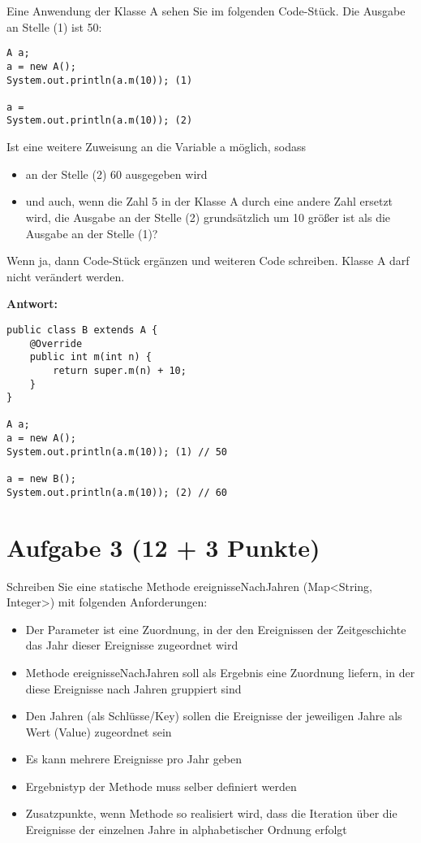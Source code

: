 Eine Anwendung der Klasse A sehen Sie im folgenden Code-Stück. Die Ausgabe an
Stelle (1) ist 50:

\begin{lstlisting}
A a;
a = new A();
System.out.println(a.m(10)); (1)

a =
System.out.println(a.m(10)); (2)
\end{lstlisting}

Ist eine weitere Zuweisung an die Variable a möglich, sodass
\begin{itemize}
    \item an der Stelle (2) 60 ausgegeben wird
    \item und auch, wenn die Zahl 5 in der Klasse A durch eine andere Zahl ersetzt wird,
          die Ausgabe an der Stelle (2) grundsätzlich um 10 größer ist als die Ausgabe an
          der Stelle (1)?
\end{itemize}

Wenn ja, dann Code-Stück ergänzen und weiteren Code schreiben. Klasse A darf
nicht verändert werden.

\textbf{Antwort:}

\begin{lstlisting}
public class B extends A {
    @Override
    public int m(int n) {
        return super.m(n) + 10;
    }
}

A a;
a = new A();
System.out.println(a.m(10)); (1) // 50

a = new B();
System.out.println(a.m(10)); (2) // 60
\end{lstlisting}

\section{Aufgabe 3 (12 + 3 Punkte)}

Schreiben Sie eine statische Methode ereignisseNachJahren (Map<String,
Integer>) mit folgenden Anforderungen:

\begin{itemize}
    \item Der Parameter ist eine Zuordnung, in der den Ereignissen der Zeitgeschichte das
          Jahr dieser Ereignisse zugeordnet wird
    \item Methode ereignisseNachJahren soll als Ergebnis eine Zuordnung liefern, in der
          diese Ereignisse nach Jahren gruppiert sind
    \item Den Jahren (als Schlüsse/Key) sollen die Ereignisse der jeweiligen Jahre als
          Wert (Value) zugeordnet sein
    \item Es kann mehrere Ereignisse pro Jahr geben
    \item Ergebnistyp der Methode muss selber definiert werden
    \item Zusatzpunkte, wenn Methode so realisiert wird, dass die Iteration über die
          Ereignisse der einzelnen Jahre in alphabetischer Ordnung erfolgt
\end{itemize}

